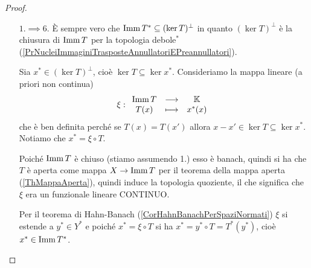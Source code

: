 \begin{proof}
\begin{itemize}
Per costruzione $\imm S$ \`e densa in $Z$ e la tesi \`e $S$ surgettiva. Dualizzando la successione
\[\begin{tikzcd}
	& Z \\
	X && Y
	\arrow[hook, from=1-2, to=2-3]
	\arrow["S", from=2-1, to=1-2]
	\arrow["T"', from=2-1, to=2-3]
\end{tikzcd}\]
troviamo
\[\begin{tikzcd}
	& {Z^\ast} \\
	{Y^\ast} && {X^\ast}
	\arrow["{S^\ast}", from=1-2, to=2-3]
	\arrow[from=2-1, to=1-2]
	\arrow["{T^\ast}"', from=2-1, to=2-3]
\end{tikzcd}\]
dove la mappa $Y^\ast\to Z^\ast$ \`e la restrizione del dominio, che \`e surgettiva per il teorema di Hahn-Banach (\ref{CorHahnBanachPerSpaziNormati}), dunque $S^\ast(Z)=T^\ast(Y)$. Notiamo che $T^\ast(Y)$ \`e chiuso in norma, quindi anche $S^\ast(Z)$ lo \`e. Poich\'e $\imm S$ \`e densa, $S^\ast$ \`e iniettiva, quindi per la caratterizzazione (\ref{ThSurgettivitaEAggiunti}) $S^\ast$ \`e fortemente iniettivo e perci\`o $S$ \`e surgettivo.
\item[$\boxed{1.\implies6.}$] \`E sempre vero che $\operatorname{Imm} T^\ast\subseteq (\ker T)^\perp$ in quanto $(\ker T)^\perp$ \`e la chiusura di $\operatorname{Imm} T$ per la topologia debole$^\ast$ (\ref{PrNucleiImmaginiTrasposteAnnullatoriEPreannullatori}).

Sia $x^\ast\in (\ker T)^\perp$, cio\`e $\ker T\subseteq \ker x^\ast$. Consideriamo la mappa lineare (a priori non continua)
\[\xi:\begin{array}{ccc} {\operatorname{Imm}T} & \longrightarrow & {\mathbb{K}}\\ {T(x)} & \longmapsto & {x^\ast(x)} \end{array}\]
che \`e ben definita perch\'e se $T(x)=T(x')$ allora $x-x'\in \ker T\subseteq \ker x^\ast$. Notiamo che $x^\ast=\xi\circ T$.

Poich\'e $\operatorname{Imm} T$ \`e chiuso (stiamo assumendo 1.) esso \`e banach, quindi si ha che $T$ \`e aperta come mappa $X\to \operatorname{Imm} T$ per il teorema della mappa aperta (\ref{ThMappaAperta}), quindi induce la topologia quoziente, il che significa che $\xi$ era un funzionale lineare CONTINUO.

Per il teorema di Hahn-Banach (\ref{CorHahnBanachPerSpaziNormati}) $\xi$ si estende a $y^\ast\in Y^\ast$ e poich\'e $x^\ast=\xi\circ T$ si ha $x^\ast=y^\ast\circ T=T^\ast(y^\ast)$, cio\`e $x^\ast\in \operatorname{Imm} T^\ast$.
\end{itemize}
\setlength{\leftmargini}{0.5cm}
\end{proof}

